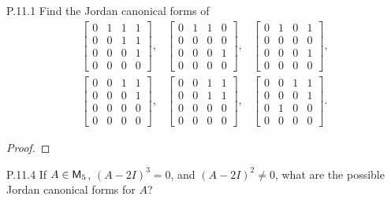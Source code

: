 \documentclass{../homework}
\begin{document}
\begin{problems}
\item[P.11.1] Find the Jordan canonical forms of
  \[
    \begin{array}{ccc}
      \begin{bmatrix} 0&1&1&1\\0&0&1&1\\0&0&0&1\\0&0&0&0 \end{bmatrix}, &
      \begin{bmatrix} 0&1&1&0\\0&0&0&0\\0&0&0&1\\0&0&0&0 \end{bmatrix}, &
      \begin{bmatrix} 0&1&0&1\\0&0&0&0\\0&0&0&1\\0&0&0&0 \end{bmatrix}, \\[2em]
      \begin{bmatrix} 0&0&1&1\\0&0&0&1\\0&0&0&0\\0&0&0&0 \end{bmatrix}, &
      \begin{bmatrix} 0&0&1&1\\0&0&1&1\\0&0&0&0\\0&0&0&0 \end{bmatrix}, &
      \begin{bmatrix} 0&0&1&1\\0&0&0&1\\0&1&0&0\\0&0&0&0 \end{bmatrix}.
    \end{array}
  \]

  \begin{solution}
    \begin{proof}

    \end{proof}
  \end{solution}

\item[P.11.4] If \(A \in \mathsf{M}_5\), \((A-2I)^3 = 0\), and
  \((A-2I)^2 \ne 0\), what are the possible Jordan canonical forms for
  \(A\)?

  \begin{solution}

  \end{solution}
\end{problems}
\end{document}
